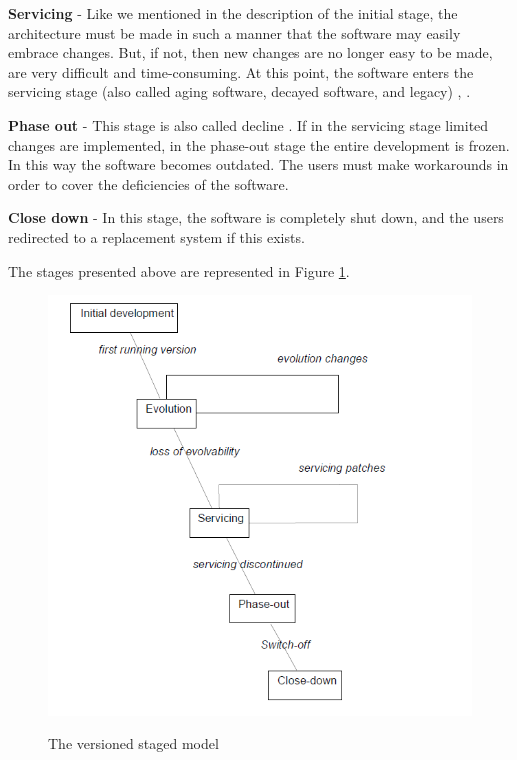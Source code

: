 \documentclass[12pt]{mitthesis}
\begin{document}
\textbf{Servicing} - Like we mentioned in the description of the initial stage, the architecture must be made in such a manner that the software may easily embrace changes. But, if not, then new changes are no longer easy to be made, are very difficult and time-consuming. At this point, the software enters the servicing stage (also called aging software, decayed software, and legacy) \cite{Software-life-cycle}, \cite{363157}.

\textbf{Phase out} - This stage is also called decline \cite{Software-life-cycle}. If in the servicing stage limited changes are implemented, in the phase-out stage the entire development is frozen. In this way the software becomes outdated. The users must make workarounds in order to cover the deficiencies of the software.

\textbf{Close down} - In this stage, the software is completely shut down, and the users redirected to a replacement system if this exists.

The stages presented above are represented in Figure \ref{fig:stagedmodel}.

\begin{figure}[H]
\centering
\includegraphics[width=\textwidth]{staged_model.png}
\label{fig:stagedmodel}
\caption{The versioned staged model \cite{model-bennett}}
\end{figure}
\end{document}
